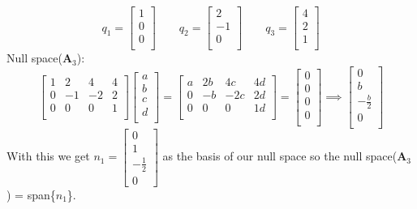 \documentclass{article}
\begin{document}
$$
q_1 =
\begin{bmatrix}
1 \\
0 \\
0 \\
\end{bmatrix}
\qquad
q_2 =
\begin{bmatrix}
2 \\
-1\\
0 \\
\end{bmatrix}
\qquad
q_3 =
\begin{bmatrix}
4 \\
2 \\
1 \\
\end{bmatrix}
$$
Null space($\mathbf{A}_3$):
$$
\begin{bmatrix}
1 & 2 & 4 & 4 \\
0 & -1& -2& 2 \\
0 & 0 & 0 & 1 \\
\end{bmatrix}
\begin{bmatrix}
a \\
b \\
c \\
d \\
\end{bmatrix}
=
\begin{bmatrix}
a & 2b& 4c& 4d\\
0 & -b&-2c& 2d\\
0 & 0 & 0 & 1d\\
\end{bmatrix}
=
\begin{bmatrix}
0 \\
0 \\
0 \\
0 \\
\end{bmatrix}
\implies
\begin{bmatrix}
0 \\
b \\
-\frac{b}{2} \\
0 \\
\end{bmatrix}
$$
With this we get $n_1 = \begin{bmatrix} 0 \\ 1 \\ -\frac{1}{2} \\ 0\end{bmatrix}$ as the basis of our null space so the null space($\mathbf{A}_3$) = span\{$n_1$\}.
\end{document}
